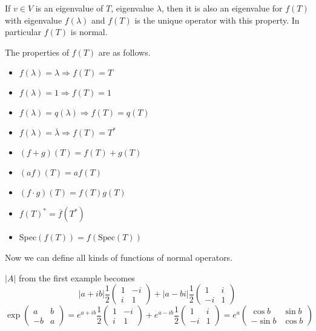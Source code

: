 \documentclass[12pt]{article}
\begin{document}
If $v \in V$ is an eigenvalue of $T$, eigenvalue $\lambda$, then it is also an eigenvalue for $f(T)$ with eigenvalue $f(\lambda)$ and $f(T)$ is the unique operator with this property. In particular $f(T)$ is normal.

\begin{ex}
	The properties of $f(T)$ are as follows.
	\begin{itemize}
		\item $f(\lambda) = \lambda \Rightarrow f(T) = T$
		\item $f(\lambda) = 1 \Rightarrow f(T) = 1$
		\item $f(\lambda) = q(\lambda) \Rightarrow f(T) = q(T)$
		\item $f(\lambda) = \overline{\lambda} \Rightarrow f(T) = T^*$
		\item $(f+g)(T) = f(T) + g(T)$
		\item $(af)(T) = af(T)$
		\item $(f\cdot g)(T) = f(T)g(T)$
		\item $f(T)^* = \overline{f}(T^*)$
		\item Spec$(f(T)) = f(\text{Spec}(T))$
	\end{itemize}
\end{ex}

Now we can define all kinds of functions of normal operators.

\begin{ex}
	$|A|$ from the first example becomes
	$$|a+ib|\frac{1}{2}\begin{pmatrix} 1 & -i \\ i & 1 \end{pmatrix} + |a-bi|\frac{1}{2}\begin{pmatrix} 1 & i \\ -i & 1 \end{pmatrix}$$
	$$\exp\begin{pmatrix} a & b \\ -b  & a \end{pmatrix} = e^{a+ib}\frac{1}{2}\begin{pmatrix} 1 & -i \\ i & 1 \end{pmatrix} + e^{a-ib}\frac{1}{2}\begin{pmatrix} 1 & i \\ -i & 1 \end{pmatrix} = e^a \begin{pmatrix} \cos b & \sin b \\ -\sin b & \cos b \end{pmatrix}$$
\end{ex}
\end{document}
